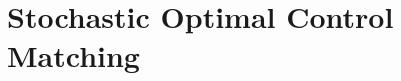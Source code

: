 \documentclass[aspectratio=169,xcolor=dvipsnames]{beamer}
\begin{document}

\section{Stochastic Optimal Control Matching}
\end{document}
